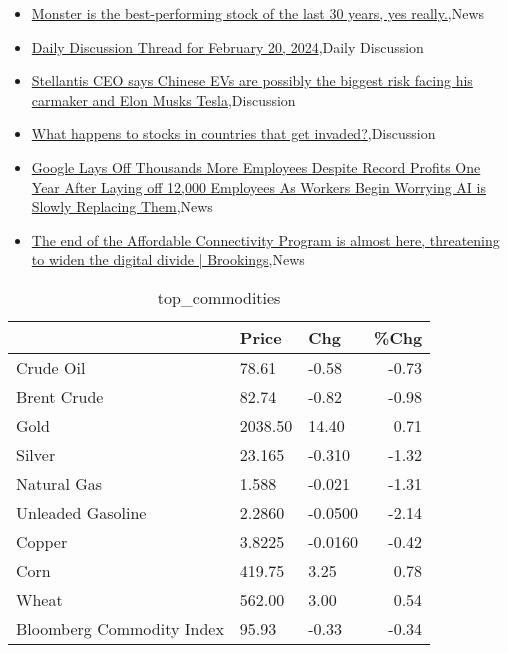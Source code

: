 \documentclass{article}%
\begin{document}
%
\begin{itemize}%
\item%
\href{https://reddit.com/r/wallstreetbets/comments/1avffxz/monster\_is\_the\_bestperforming\_stock\_of\_the\_last/}{Monster is the best-performing stock of the last 30 years, yes really.},News%
\item%
\href{https://reddit.com/r/wallstreetbets/comments/1avf0p1/daily\_discussion\_thread\_for\_february\_20\_2024/}{Daily Discussion Thread for February 20, 2024},Daily Discussion%
\item%
\href{https://reddit.com/r/StockMarket/comments/1av4sho/stellantis\_ceo\_says\_chinese\_evs\_are\_possibly\_the/}{Stellantis CEO says Chinese EVs are possibly the biggest risk facing his carmaker and Elon Musks Tesla},Discussion%
\item%
\href{https://reddit.com/r/StockMarket/comments/1auy6jp/what\_happens\_to\_stocks\_in\_countries\_that\_get/}{What happens to stocks in countries that get invaded?},Discussion%
\item%
\href{https://reddit.com/r/Economics/comments/1avbszs/google\_lays\_off\_thousands\_more\_employees\_despite/}{Google Lays Off Thousands More Employees Despite Record Profits One Year After Laying off 12,000 Employees As Workers Begin Worrying AI is Slowly Replacing Them},News%
\item%
\href{https://reddit.com/r/Economics/comments/1av44vr/the\_end\_of\_the\_affordable\_connectivity\_program\_is/}{The end of the Affordable Connectivity Program is almost here, threatening to widen the digital divide | Brookings},News%
\end{itemize}%


\begin{table}[htbp]%
\caption{top\_commodities}%
\centering%
\begin{adjustbox}{width=1\textwidth}%
\begin{tabular}{lllr}
\toprule
                          &   Price &     Chg &  \%Chg \\
\midrule
               Crude Oil  &   78.61 &   -0.58 & -0.73 \\
             Brent Crude  &   82.74 &   -0.82 & -0.98 \\
                    Gold  & 2038.50 &   14.40 &  0.71 \\
                  Silver  &  23.165 &  -0.310 & -1.32 \\
             Natural Gas  &   1.588 &  -0.021 & -1.31 \\
       Unleaded Gasoline  &  2.2860 & -0.0500 & -2.14 \\
                  Copper  &  3.8225 & -0.0160 & -0.42 \\
                    Corn  &  419.75 &    3.25 &  0.78 \\
                   Wheat  &  562.00 &    3.00 &  0.54 \\
Bloomberg Commodity Index &   95.93 &   -0.33 & -0.34 \\
\bottomrule
\end{tabular}
%
\end{adjustbox}%
\end{table}
\end{document}

